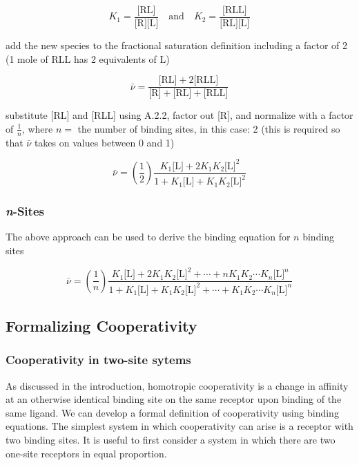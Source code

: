 \begin{equation}
K_1 = \frac{\text{[RL]}}{\text{[R][L]}} \quad \text{and} \quad K_2 = \frac{\text{[RLL]}}{\text{[RL][L]}}
\end{equation}

add the new species to the fractional saturation definition including a factor of 2 (1 mole of RLL has 2 equivalents of L)

\begin{equation}
	\bar{\nu} = \frac{\text{[RL]} + 2 \text{[RLL]}}{\text{[R]} + \text{[RL]} + \text{[RLL]}}
\end{equation}

substitute [RL] and [RLL] using A.2.2, factor out [R], and normalize with a factor of \(\frac{1}{n}\), where \(n = \) the number of binding sites, in this case: 2 (this is required so that \(\bar{\nu}\) takes on values between 0 and 1)

\begin{equation}
	\bar{\nu} = \left(\frac{1}{2}\right) \frac{K_1 \text{[L]} + 2 K_1 K_2 \text{[L]}^2}{1 + K_1 \text{[L]} + K_1 K_2 \text{[L]}^2}
\end{equation}

\subsubsection*{\emph{n}-Sites}

The above approach can be used to derive the binding equation for \(n\) binding sites

\begin{equation}
	\bar{\nu} = \left(\frac{1}{n}\right) \frac{K_1 \text{[L]} + 2 K_1 K_2 \text{[L]}^2 + \cdots + n K_1 K_2 \cdots K_n \text{[L]}^n}{1 + K_1 \text{[L]} + K_1 K_2 \text{[L]}^2 + \cdots + K_1 K_2 \cdots K_n \text{[L]}^n}
\end{equation}

\subsection{Formalizing Cooperativity}

\subsubsection*{Cooperativity in two-site sytems}

As discussed in the introduction, homotropic cooperativity is a change in affinity at an otherwise identical binding site on the same receptor upon binding of the same ligand. We can develop a formal definition of cooperativity using binding equations. The simplest system in which cooperativity can arise is a receptor with two binding sites. It is useful to first consider a system in which there are two one-site receptors in equal proportion.\supercite{wyman_binding_1990}

